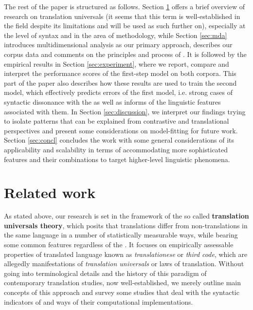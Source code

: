 \documentclass[output=paper]{langsci/langscibook.cls}
\begin{document}
The rest of the paper is structured as follows. Section \ref{sec:related} offers a brief overview of research on translation universals (it seems that this term is well-established in the field despite its limitations and will be used as such further on), especially at the level of syntax and in the area of methodology, while Section \ref{sec:mda} introduces multidimensional analysis as our primary approach, describes our corpus data and comments on the principles and process of . It is followed by the empirical results in Section \ref{sec:experiment}, where we report, compare and interpret the performance scores of the first-step model on both corpora. This part of the paper also describes how these results are used to train the second model, which effectively predicts errors of the first model, i.e. strong cases of syntactic dissonance with the  as well as informs of the linguistic features associated with them. In Section \ref{sec:discussion}, we interpret our findings trying to isolate patterns that can be explained from contrastive and translational perspectives and present some considerations on model-fitting for future work. Section \ref{sec:concl} concludes the work with some general considerations of its applicability and scalability in terms of accommodating more sophisticated features and their combinations to target higher-level linguistic phenomena.

\section{Related work}\label{sec:related}

As stated above, our research is set in the framework of the so called \textbf{translation universals theory}, which posits that translations differ from non-translations in the same language in a number of statistically measurable ways, while bearing some common features regardless of the . It focuses on empirically assessable properties of translated language known as \textit{translationese} or \textit{third code}, which are allegedly manifestations of \textit{translation universals} or laws of translation. Without going into terminological details and the history of this paradigm of contemporary translation studies, now well-established, we merely outline main concepts of this approach and survey some studies that deal with the syntactic indicators of  and ways of their computational implementations. 
\end{document}
